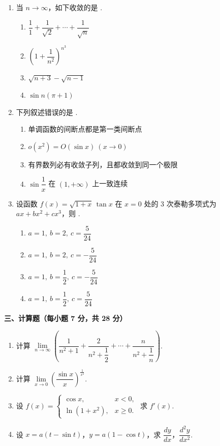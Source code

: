 \documentclass[a4paper,11pt]{ctexart}
\newcommand{\blank}[1][2.6cm]{\underline{\hspace{#1}}}
\begin{document}
\begin{enumerate}[label=\arabic*., leftmargin=2em, itemsep=0.8em, topsep=0.5em]
  \item 当 $n\to\infty$，如下收敛的是 \blank[1.8cm].
  \begin{enumerate}[label=\Alph*., leftmargin=2.2em, itemsep=0.3em, topsep=0.3em]
    \item $\dfrac{1}{1}+\dfrac{1}{\sqrt{2}}+\cdots+\dfrac{1}{\sqrt{n}}$
    \item $\left(1+\dfrac{1}{n^2}\right)^{n^3}$
    \item $\sqrt{n+3}-\sqrt{n-1}$
    \item $\sin n(\pi+1)$
  \end{enumerate}

  \item 下列叙述错误的是 \blank[1.8cm].
  \begin{enumerate}[label=\Alph*., leftmargin=2.2em, itemsep=0.3em, topsep=0.3em]
    \item 单调函数的间断点都是第一类间断点
    \item $o(x^2)=O(\sin x)\ (x\to 0)$
    \item 有界数列必有收敛子列，且都收敛到同一个极限
    \item $\sin\dfrac{1}{x}$ 在 $(1,+\infty)$ 上一致连续
  \end{enumerate}

  \item 设函数 $f(x)=\sqrt{1+x}\,\tan x$ 在 $x=0$ 处的 $3$ 次泰勒多项式为 $ax+bx^2+cx^3$，则 \blank[1.8cm].
  \begin{enumerate}[label=\Alph*., leftmargin=2.2em, itemsep=0.3em, topsep=0.3em]
    \item $a=1,\ b=2,\ c=\dfrac{5}{24}$
    \item $a=1,\ b=2,\ c=-\dfrac{5}{24}$
    \item $a=1,\ b=\dfrac{1}{2},\ c=-\dfrac{5}{24}$
    \item $a=1,\ b=\dfrac{1}{2},\ c=\dfrac{5}{24}$
  \end{enumerate}
\end{enumerate}

\vspace{0.8em}
\textbf{三、计算题（每小题 7 分，共 28 分）}

\begin{enumerate}[label=\arabic*., leftmargin=2em, itemsep=0.9em, topsep=0.5em]
  \item 计算 $\lim\limits_{n\to\infty}\left(\dfrac{1}{n^2+1}+\dfrac{2}{n^2+\dfrac{1}{2}}+\cdots+\dfrac{n}{n^2+\dfrac{1}{n}}\right)$.

  \item 计算 $\lim\limits_{x\to 0}\left(\dfrac{\sin x}{x}\right)^{\frac{1}{x^2}}$.

  \item 设 $f(x)=\begin{cases} \cos x, & x<0, \\ \ln(1+x^2), & x\ge 0. \end{cases}$ 求 $f'(x)$.

  \item 设 $x=a(t-\sin t)$，$y=a(1-\cos t)$，求 $\dfrac{dy}{dx}$，$\dfrac{d^2y}{dx^2}$.
\end{enumerate}
\end{document}
